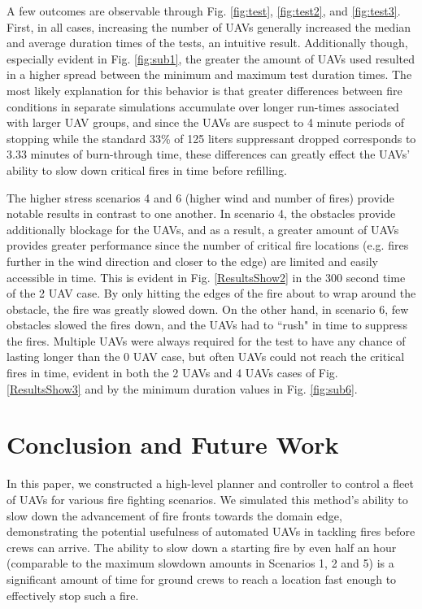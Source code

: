 \documentclass{ieeeaccess}
\begin{document}
A few outcomes are observable through Fig. \ref{fig:test}, \ref{fig:test2}, and \ref{fig:test3}. First, in all cases, increasing the number of UAVs generally increased the median and average duration times of the tests, an intuitive result. Additionally though, especially evident in Fig. \ref{fig:sub1}, the greater the amount of UAVs used resulted in a higher spread between the minimum and maximum test duration times. The most likely explanation for this behavior is that greater differences between fire conditions in separate simulations accumulate over longer run-times associated with larger UAV groups, and since the UAVs are suspect to 4 minute periods of stopping while the standard 33\% of 125 liters suppressant dropped corresponds to 3.33 minutes of burn-through time, these differences can greatly effect the UAVs' ability to slow down critical fires in time before refilling. 

The higher stress scenarios 4 and 6 (higher wind and number of fires) provide notable results in contrast to one another. In scenario 4, the obstacles provide additionally blockage for the UAVs, and as a result, a greater amount of UAVs provides greater performance since the number of critical fire locations (e.g. fires further in the wind direction and closer to the edge) are limited and easily accessible in time. This is evident in Fig. \ref{ResultsShow2} in the 300 second time of the 2 UAV case. By only hitting the edges of the fire about to wrap around the obstacle, the fire was greatly slowed down. On the other hand, in scenario 6, few obstacles slowed the fires down, and the UAVs had to ``rush" in time to suppress the fires. Multiple UAVs were always required for the test to have any chance of lasting longer than the 0 UAV case, but often UAVs could not reach the critical fires in time, evident in both the 2 UAVs and 4 UAVs cases of Fig. \ref{ResultsShow3} and by the minimum duration values in Fig. \ref{fig:sub6}.
\section{Conclusion and Future Work}

In this paper, we constructed a high-level planner and controller to control a fleet of UAVs for various fire fighting scenarios. We simulated this method's ability to slow down the advancement of fire fronts towards the domain edge, demonstrating the potential usefulness of automated UAVs in tackling fires before crews can arrive. The ability to slow down a starting fire by even half an hour (comparable to the maximum slowdown amounts in Scenarios 1, 2 and 5) is a significant amount of time for ground crews to reach a location fast enough to effectively stop such a fire.
\end{document}

